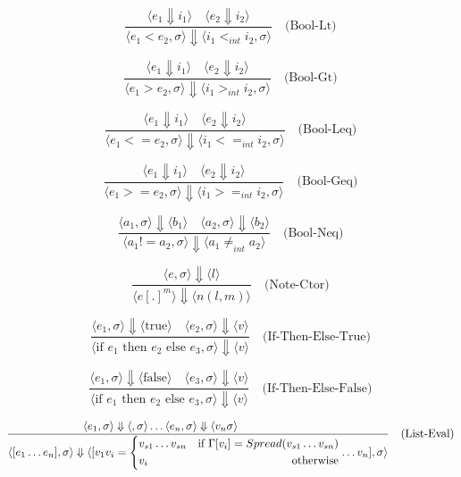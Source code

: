 \documentclass[letterpaper,12pt]{article}
\begin{document}
    \[
    \frac{\langle e_1 \Downarrow i_1 \rangle \quad \langle e_2 \Downarrow i_2 \rangle}
    {\langle e_1 < e_2 , \sigma\rangle \Downarrow \langle i_1 <_{int} i_2 , \sigma\rangle}  {} \quad \text{(Bool-Lt)}
    \]
    
    \[
    \frac{\langle e_1 \Downarrow i_1 \rangle \quad \langle e_2 \Downarrow i_2 \rangle}
    {\langle e_1 > e_2 , \sigma\rangle \Downarrow \langle i_1 >_{int} i_2 , \sigma\rangle}  {} \quad \text{(Bool-Gt)}
    \]

    \[
    \frac{\langle e_1 \Downarrow i_1 \rangle \quad \langle e_2 \Downarrow i_2 \rangle}
    {\langle e_1 <= e_2 , \sigma\rangle \Downarrow \langle i_1 <=_{int} i_2 , \sigma\rangle}  {} \quad \text{(Bool-Leq)}
    \]
    
    \[
    \frac{\langle e_1 \Downarrow i_1 \rangle \quad \langle e_2 \Downarrow i_2 \rangle}
    {\langle e_1 >= e_2 , \sigma\rangle \Downarrow \langle i_1 >=_{int} i_2 , \sigma\rangle}  {} \quad \text{(Bool-Geq)}
    \]

    \[
    \frac{\langle a_1, \sigma \rangle \Downarrow \langle b_1 \rangle \quad \langle a_2, \sigma \rangle \Downarrow \langle b_2 \rangle}{\langle a_1 != a_2, \sigma \rangle \Downarrow \langle a_1 \neq_{int} a_2 \rangle} \quad \text{(Bool-Neq)}
    \]

    \[
    \frac{\langle e, \sigma \rangle \Downarrow \langle l \rangle}{\langle e [.]^m \rangle \Downarrow \langle n(l, m)  \rangle} \quad \text{(Note-Ctor)}
    \]

    \[
    \frac{\langle e_1, \sigma \rangle \Downarrow \langle \text{true} \rangle \quad \langle e_2, \sigma \rangle \Downarrow \langle v \rangle}{\langle \text{if } e_1 \text{ then } e_2 \text{ else } e_3, \sigma \rangle \Downarrow \langle v \rangle} \quad \text{(If-Then-Else-True)}
    \]

    \[
    \frac{\langle e_1, \sigma \rangle \Downarrow \langle \text{false} \rangle \quad \langle e_3, \sigma \rangle \Downarrow \langle v \rangle}{\langle \text{if } e_1 \text{ then } e_2 \text{ else } e_3, \sigma \rangle \Downarrow \langle v \rangle} \quad \text{(If-Then-Else-False)}
    \]

    \[
    \frac
    {
        \langle e_1, \sigma \rangle \Downarrow 
        \langle , \sigma \rangle 
        \dots \langle e_n, \sigma \rangle \Downarrow \langle v_n \sigma \rangle \\    
    }
    {\langle [e_1 \dots e_n] , \sigma  \rangle \Downarrow \langle [v_1
    v_i=\left\{
        \begin{aligned}
            &v_{s1} \dots v_{sn}  &\text{if} \ \Gamma[v_i] = Spread(v_{s1} \dots v_{sn})  \\
            &v_i &\text{otherwise} 
        \end{aligned} 
    \right.
    \dots v_n] ,\sigma \rangle}
    \quad \text{(List-Eval)}
    \]
    
\end{document}
